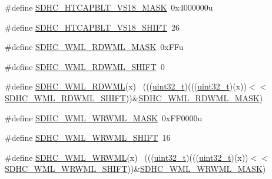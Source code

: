 \begin{DoxyCompactItemize}
\item 
\#define \hyperlink{group___s_d_h_c___register___masks_ga5677e346e2d7f65fbaf2615a331f3438}{S\+D\+H\+C\+\_\+\+H\+T\+C\+A\+P\+B\+L\+T\+\_\+\+V\+S18\+\_\+\+M\+A\+SK}~0x4000000u
\item 
\#define \hyperlink{group___s_d_h_c___register___masks_gaa162e0efb46d0271d898b43e7707e8e0}{S\+D\+H\+C\+\_\+\+H\+T\+C\+A\+P\+B\+L\+T\+\_\+\+V\+S18\+\_\+\+S\+H\+I\+FT}~26
\item 
\#define \hyperlink{group___s_d_h_c___register___masks_gae6b31e76805f36f9903c70818642decc}{S\+D\+H\+C\+\_\+\+W\+M\+L\+\_\+\+R\+D\+W\+M\+L\+\_\+\+M\+A\+SK}~0x\+F\+Fu
\item 
\#define \hyperlink{group___s_d_h_c___register___masks_gaccbe2485e8ba11877a5d0c45efef3cf5}{S\+D\+H\+C\+\_\+\+W\+M\+L\+\_\+\+R\+D\+W\+M\+L\+\_\+\+S\+H\+I\+FT}~0
\item 
\#define \hyperlink{group___s_d_h_c___register___masks_gad6fd0c9782918c250a571fd84874d80e}{S\+D\+H\+C\+\_\+\+W\+M\+L\+\_\+\+R\+D\+W\+ML}(x)                                            ~(((\hyperlink{_p_e___types_8h_a33594304e786b158f3fb30289278f5af}{uint32\+\_\+t})(((\hyperlink{_p_e___types_8h_a33594304e786b158f3fb30289278f5af}{uint32\+\_\+t})(x))$<$$<$\hyperlink{group___s_d_h_c___register___masks_gaccbe2485e8ba11877a5d0c45efef3cf5}{S\+D\+H\+C\+\_\+\+W\+M\+L\+\_\+\+R\+D\+W\+M\+L\+\_\+\+S\+H\+I\+FT}))\&\hyperlink{group___s_d_h_c___register___masks_gae6b31e76805f36f9903c70818642decc}{S\+D\+H\+C\+\_\+\+W\+M\+L\+\_\+\+R\+D\+W\+M\+L\+\_\+\+M\+A\+SK})
\item 
\#define \hyperlink{group___s_d_h_c___register___masks_gabfe9926c62d373c8d28b1bcc7ba0010f}{S\+D\+H\+C\+\_\+\+W\+M\+L\+\_\+\+W\+R\+W\+M\+L\+\_\+\+M\+A\+SK}~0x\+F\+F0000u
\item 
\#define \hyperlink{group___s_d_h_c___register___masks_ga026a7e92688832bffea0905554f30253}{S\+D\+H\+C\+\_\+\+W\+M\+L\+\_\+\+W\+R\+W\+M\+L\+\_\+\+S\+H\+I\+FT}~16
\item 
\#define \hyperlink{group___s_d_h_c___register___masks_gacd645e9061dda369caa06214d404e980}{S\+D\+H\+C\+\_\+\+W\+M\+L\+\_\+\+W\+R\+W\+ML}(x)                                            ~(((\hyperlink{_p_e___types_8h_a33594304e786b158f3fb30289278f5af}{uint32\+\_\+t})(((\hyperlink{_p_e___types_8h_a33594304e786b158f3fb30289278f5af}{uint32\+\_\+t})(x))$<$$<$\hyperlink{group___s_d_h_c___register___masks_ga026a7e92688832bffea0905554f30253}{S\+D\+H\+C\+\_\+\+W\+M\+L\+\_\+\+W\+R\+W\+M\+L\+\_\+\+S\+H\+I\+FT}))\&\hyperlink{group___s_d_h_c___register___masks_gabfe9926c62d373c8d28b1bcc7ba0010f}{S\+D\+H\+C\+\_\+\+W\+M\+L\+\_\+\+W\+R\+W\+M\+L\+\_\+\+M\+A\+SK})

\end{DoxyCompactItemize}
